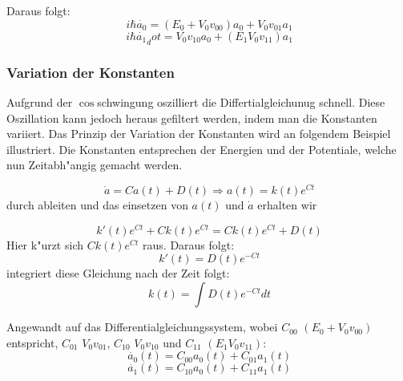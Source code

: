 \begin{refsection}
Daraus folgt:
\[
\ i\hbar\dot{a_{0}} = (E_{0} + V_{0} v_{00}) a_{0} + V_{0} v_{01} a_{1}
\]
\[
\ i\hbar\dot{a_{1}}_dot = V_{0} v_{10} a_{0} + (E_{1} V_{0} v_{11}) a_{1}
\]

\subsubsection{Variation der Konstanten}
Aufgrund der $\cos$schwingung oszilliert die Differtialgleichunug
schnell. Diese Oszillation kann jedoch heraus gefiltert werden, indem
man die Konstanten variiert. Das Prinzip der Variation der Konstanten
wird an folgendem Beispiel illustriert. Die Konstanten entsprechen der
Energien und der Potentiale, welche nun Zeitabh"angig gemacht werden.

\[
\ \dot{a} = C a(t) + D(t) \Rightarrow a(t) = k(t) e^{C t}
\] 
durch ableiten und das einsetzen von $ a(t)$ und  $ \dot{a} $ erhalten wir

\[
\ k'(t) e^{C t} + C k(t) e^{C t} = C k(t) e^{C t} + D(t)
\] 
Hier k"urzt sich $ C k(t) e^{C t} $ raus.
Daraus folgt:
\[
\ k'(t) = D(t) e^{-C t}
\] 
integriert diese Gleichung nach der Zeit folgt:
\[
\ k(t) = \int D(t) e^{-C t} dt 
\]
 
Angewandt auf das Differentialgleichungssystem, wobei $C_{00}$ $(E_{0} + V_{0} v_{00})$ entspricht, $C_{01}$ $V_{0} v_{01}$, $C_{10}$ $V_{0} v_{10}$ und $C_{11}$ $(E_{1} V_{0} v_{11})$:
\[
\ \dot{a_{0}}(t) = C_{00}a_{0}(t) + C_{01}a_{1}(t)
\]
\[
\ \dot{a_{1}}(t) = C_{10}a_{0}(t) + C_{11}a_{1}(t)
\]


\end{refsection}
